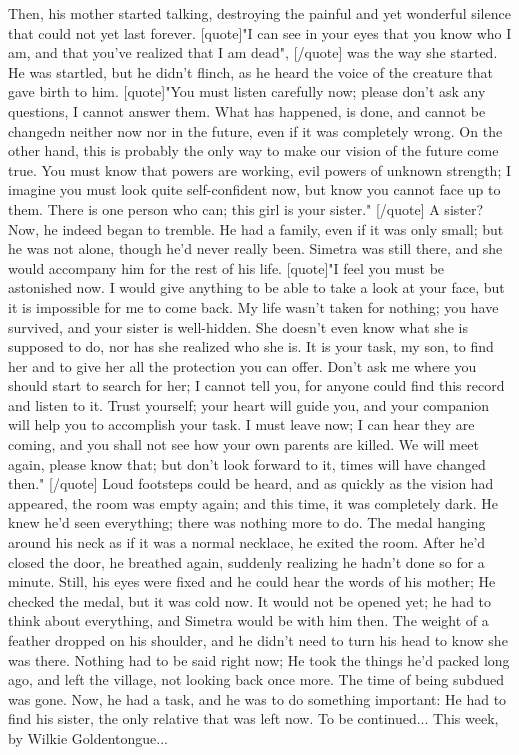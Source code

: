 Then, his mother started talking, destroying the painful and yet wonderful silence that could not yet last forever. 
[quote]"I can see in your eyes that you know who I am, and that you've realized that I am dead", 
[/quote]
was the way she started. He was startled, but he didn't flinch, as he heard the voice of the creature that gave birth to him. 
[quote]"You must listen carefully now; please don't ask any questions, I cannot answer them. What has happened, is done, and cannot be changedn neither now nor in the future, even if it was completely wrong. On the other hand, this is probably the only way to make our vision of the future come true. You must know that powers are working, evil powers of unknown strength; I imagine you must look quite self-confident now, but know you cannot face up to them. There is one person who can; this girl is your sister."
[/quote]
A sister? Now, he indeed began to tremble. He had a family, even if it was only small; but he was not alone, though he'd never really been. Simetra was still there, and she would accompany him for the rest of his life. 
[quote]"I feel you must be astonished now. I would give anything to be able to take a look at your face, but it is impossible for me to come back. My life wasn't taken for nothing; you have survived, and your sister is well-hidden. She doesn't even know what she is supposed to do, nor has she realized who she is. It is your task, my son, to find her and to give her all the protection you can offer. Don't ask me where you should start to search for her; I cannot tell you, for anyone could find this record and listen to it. Trust yourself; your heart will guide you, and your companion will help you to accomplish your task. I must leave now; I can hear they are coming, and you shall not see how your own parents are killed. We will meet again, please know that; but don't look forward to it, times will have changed then."
[/quote]
Loud footsteps could be heard, and as quickly as the vision had appeared, the room was empty again; and this time, it was completely dark. He knew he'd seen everything; there was nothing more to do. The medal hanging around his neck as if it was a normal necklace, he exited the room. After he'd closed the door, he breathed again, suddenly realizing he hadn't done so for a minute. Still, his eyes were fixed and he could hear the words of his mother; He checked the medal, but it was cold now. It would not be opened yet; he had to think about everything, and Simetra would be with him then. 
The weight of a feather dropped on his shoulder, and he didn't need to turn his head to know she was there. 
Nothing had to be said right now; He took the things he'd packed long ago, and left the village, not looking back once more. 
The time of being subdued was gone. Now, he had a task, and he was to do something important: He had to find his sister, the only relative that was left now. 
To be continued...
This week, by Wilkie Goldentongue...
